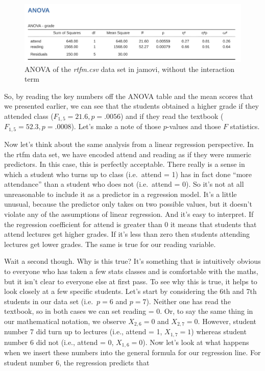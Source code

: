 \documentclass[
  a4paper,
]{book}
\begin{document}
\begin{figure}

\includegraphics[width=1\textwidth,height=\textheight]{images/fig14-17.png} \hfill{}

\caption{\label{fig-fig14-17}ANOVA of the \emph{rtfm.csv} data set in
jamovi, without the interaction term}

\end{figure}

So, by reading the key numbers off the ANOVA table and the mean scores
that we presented earlier, we can see that the students obtained a
higher grade if they attended class (\(F_{1,5} = 21.6, p = .0056\)) and
if they read the textbook (\(F_{1,5} = 52.3, p = .0008\)). Let's make a
note of those \(p\)-values and those \(F\) statistics.

Now let's think about the same analysis from a linear regression
perspective. In the rtfm data set, we have encoded attend and reading as
if they were numeric predictors. In this case, this is perfectly
acceptable. There really is a sense in which a student who turns up to
class (i.e.~attend = 1) has in fact done ``more attendance'' than a
student who does not (i.e.~attend = 0). So it's not at all unreasonable
to include it as a predictor in a regression model. It's a little
unusual, because the predictor only takes on two possible values, but it
doesn't violate any of the assumptions of linear regression. And it's
easy to interpret. If the regression coefficient for attend is greater
than 0 it means that students that attend lectures get higher grades. If
it's less than zero then students attending lectures get lower grades.
The same is true for our reading variable.

Wait a second though. Why is this true? It's something that is
intuitively obvious to everyone who has taken a few stats classes and is
comfortable with the maths, but it isn't clear to everyone else at first
pass. To see why this is true, it helps to look closely at a few
specific students. Let's start by considering the 6th and 7th students
in our data set (i.e.~\(p = 6\) and \(p = 7\)). Neither one has read the
textbook, so in both cases we can set reading = 0. Or, to say the same
thing in our mathematical notation, we observe \(X_{2,6} = 0\) and
\(X_{2,7} = 0\). However, student number 7 did turn up to lectures
(i.e., attend = 1, \(X_{1,7} = 1\)) whereas student number 6 did not
(i.e., attend = 0, \(X_{1,6} = 0\)). Now let's look at what happens when
we insert these numbers into the general formula for our regression
line. For student number 6, the regression predicts that
\end{document}
